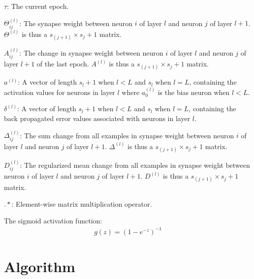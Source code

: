 \documentclass[12pt,notitlepage]{report}
\begin{document}
  $\tau$: The current epoch.

  $\Theta_{ij}^{(l)}$: The synapse weight between neuron $i$ of layer $l$ and
  neuron $j$ of layer $l+1$.  $\Theta^{(l)}$ is thus a
  $s_{(j+1)} \times s_{j}+1$ matrix.

  $A_{ij}^{(l)}$: The change in synapse weight between neuron $i$ of layer $l$
  and neuron $j$ of layer $l+1$ of the last epoch.  $A^{(l)}$ is thus a
  $s_{(j+1)} \times s_{j}+1$ matrix.

  $a^{(l)}$: A vector of length $s_{l} + 1$ when $l < L$ and $s_{l}$ when $l =
  L$, containing the activation values for neurons in layer $l$ where
  $a_{0}^{(l)}$ is the bias neuron when $l < L$.

  $\delta^{(l)}$: A vector of length $s_{l} + 1$ when $l < L$ and $s_{l}$ when
  $l = L$, containing the back propagated error values associated with neurons
  in layer $l$.

  $\Delta_{ij}^{(l)}$: The sum change from all examples in synapse weight
  between neuron $i$ of layer $l$ and neuron $j$ of layer $l+1$.  $\Delta^{(l)}$
  is thus a $s_{(j+1)} \times s_{j}+1$ matrix.

  $D_{ij}^{(l)}$: The regularized mean change from all examples in synapse
  weight between neuron $i$ of layer $l$ and neuron $j$ of layer $l+1$.
  $D^{(l)}$ is thus a $s_{(j+1)} \times s_{j}+1$ matrix.

  $.*$: Element-wise matrix multiplication operator.

  The sigmoid activation function:
  \begin{align}
    g(z) = (1 - e^{-z})^{-1}
  \end{align}

  \section{Algorithm}
\end{document}

